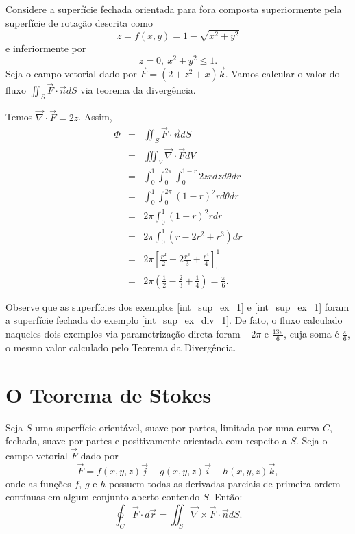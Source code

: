 \begin{ex}\label{int_sup_ex_div_1} Considere a superfície fechada orientada para fora composta superiormente pela superfície de rotação descrita como
$$z=f(x,y)=1- \sqrt{x^2+y^2}$$ e inferiormente por
$$z=0,~ {x^2+y^2}\leq 1.$$
Seja o campo vetorial dado por
$\vec{F}=(2+z^2+x)\vec{k}$. Vamos calcular o valor do fluxo $\iint_S\vec{F}\cdot \vec{n} dS$ via teorema da divergência.

Temos $\vec{\nabla}\cdot \vec{F}=2z$. Assim,
\begin{eqnarray*}
\Phi&=&\iint_S \vec{F}\cdot \vec{n}dS\\
&=&\iiint_V \vec{\nabla}\cdot \vec{F} dV\\
&=&\int_0^1 \int_0^{2\pi}  \int_0^{1-r} 2z rdzd\theta dr\\
&=&\int_0^1 \int_0^{2\pi}   (1-r)^2 rd\theta dr\\
&=&2\pi \int_0^1    (1-r)^2 r dr\\
&=&2\pi \int_0^1    \left(r-2r^2+r^3\right) dr\\
&=&2\pi  \left[\frac{r^2}{2}-2\frac{r^3}{3}+\frac{r^4}{4}\right]_{0}^1\\
&=&2\pi  \left(\frac{1}{2}-\frac{2}{3}+\frac{1}{4}\right)=\frac{\pi}{6}.
\end{eqnarray*}

Observe que as superfícies dos exemplos \ref{int_sup_ex_1} e \ref{int_sup_ex_1} foram a superfície fechada do exemplo \ref{int_sup_ex_div_1}. De fato, o fluxo calculado naqueles dois exemplos via parametrização direta foram $-2\pi$ e $\frac{13\pi}{6}$, cuja soma é $\frac{\pi}{6}$, o mesmo valor calculado pelo Teorema da Divergência.
\end{ex}



\section{O Teorema de Stokes}

\begin{teo}
Seja $S$ uma superfície orientável, suave por partes, limitada por uma curva $C$, fechada, suave por partes e positivamente orientada com respeito a $S$. Seja o campo vetorial $\vec{F}$ dado por
$$
\vec{F}=f(x,y,z)\vec{j}+g(x,y,z)\vec{i}+h(x,y,z)\vec{k},
$$
onde as funções $f$, $g$ e $h$ possuem todas as derivadas parciais de primeira ordem contínuas em algum conjunto aberto contendo $S$. Então:
$$
\oint_C \vec{F}\cdot d \vec{r}=\iint_S \vec{\nabla}\times \vec{F}\cdot \vec{n} dS.
$$
\end{teo}
